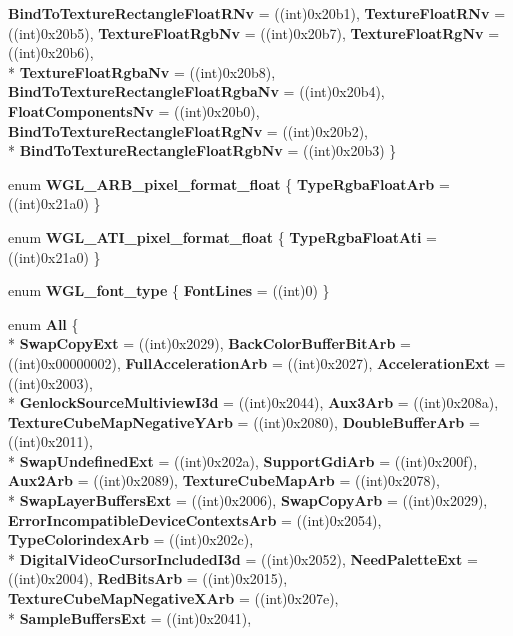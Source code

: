 \begin{DoxyCompactItemize}
{\bfseries Bind\-To\-Texture\-Rectangle\-Float\-R\-Nv} = ((int)0x20b1), 
{\bfseries Texture\-Float\-R\-Nv} = ((int)0x20b5), 
{\bfseries Texture\-Float\-Rgb\-Nv} = ((int)0x20b7), 
{\bfseries Texture\-Float\-Rg\-Nv} = ((int)0x20b6), 
\\*
{\bfseries Texture\-Float\-Rgba\-Nv} = ((int)0x20b8), 
{\bfseries Bind\-To\-Texture\-Rectangle\-Float\-Rgba\-Nv} = ((int)0x20b4), 
{\bfseries Float\-Components\-Nv} = ((int)0x20b0), 
{\bfseries Bind\-To\-Texture\-Rectangle\-Float\-Rg\-Nv} = ((int)0x20b2), 
\\*
{\bfseries Bind\-To\-Texture\-Rectangle\-Float\-Rgb\-Nv} = ((int)0x20b3)
 \}
\item 
enum {\bfseries W\-G\-L\-\_\-\-A\-R\-B\-\_\-pixel\-\_\-format\-\_\-float} \{ {\bfseries Type\-Rgba\-Float\-Arb} = ((int)0x21a0)
 \}
\item 
enum {\bfseries W\-G\-L\-\_\-\-A\-T\-I\-\_\-pixel\-\_\-format\-\_\-float} \{ {\bfseries Type\-Rgba\-Float\-Ati} = ((int)0x21a0)
 \}
\item 
enum {\bfseries W\-G\-L\-\_\-font\-\_\-type} \{ {\bfseries Font\-Lines} = ((int)0)
 \}
\item 
enum {\bfseries All} \{ \\*
{\bfseries Swap\-Copy\-Ext} = ((int)0x2029), 
{\bfseries Back\-Color\-Buffer\-Bit\-Arb} = ((int)0x00000002), 
{\bfseries Full\-Acceleration\-Arb} = ((int)0x2027), 
{\bfseries Acceleration\-Ext} = ((int)0x2003), 
\\*
{\bfseries Genlock\-Source\-Multiview\-I3d} = ((int)0x2044), 
{\bfseries Aux3\-Arb} = ((int)0x208a), 
{\bfseries Texture\-Cube\-Map\-Negative\-Y\-Arb} = ((int)0x2080), 
{\bfseries Double\-Buffer\-Arb} = ((int)0x2011), 
\\*
{\bfseries Swap\-Undefined\-Ext} = ((int)0x202a), 
{\bfseries Support\-Gdi\-Arb} = ((int)0x200f), 
{\bfseries Aux2\-Arb} = ((int)0x2089), 
{\bfseries Texture\-Cube\-Map\-Arb} = ((int)0x2078), 
\\*
{\bfseries Swap\-Layer\-Buffers\-Ext} = ((int)0x2006), 
{\bfseries Swap\-Copy\-Arb} = ((int)0x2029), 
{\bfseries Error\-Incompatible\-Device\-Contexts\-Arb} = ((int)0x2054), 
{\bfseries Type\-Colorindex\-Arb} = ((int)0x202c), 
\\*
{\bfseries Digital\-Video\-Cursor\-Included\-I3d} = ((int)0x2052), 
{\bfseries Need\-Palette\-Ext} = ((int)0x2004), 
{\bfseries Red\-Bits\-Arb} = ((int)0x2015), 
{\bfseries Texture\-Cube\-Map\-Negative\-X\-Arb} = ((int)0x207e), 
\\*
{\bfseries Sample\-Buffers\-Ext} = ((int)0x2041), 

\end{DoxyCompactItemize}
